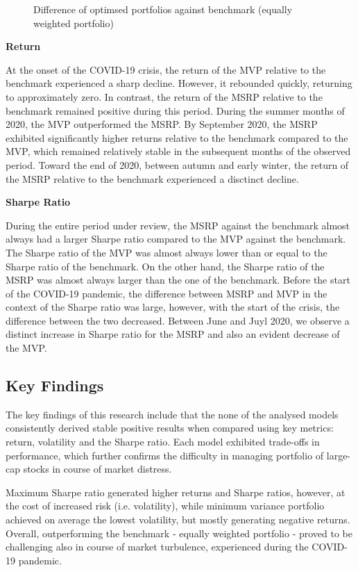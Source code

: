 \documentclass[a4paper,12pt]{article}
\begin{document}
\begin{figure}[H]
\begin{minipage}{0.7\textwidth}
    \end{minipage}
    \caption{Difference of optimsed portfolios against benchmark (equally weighted portfolio)}
    \label{fig:compare}
\end{figure}




\textbf{Return}

At the onset of the COVID-19 crisis, the return of the MVP relative to the benchmark experienced a sharp decline. However, it rebounded quickly, returning to approximately zero. In contrast, the return of the MSRP relative to the benchmark remained positive during this period. During the summer months of 2020, the MVP outperformed the MSRP. By September 2020, the MSRP exhibited significantly higher returns relative to the benchmark compared to the MVP, which remained relatively stable in the subsequent months of the observed period. Toward the end of 2020, between autumn and early winter, the return of the MSRP relative to the benchmark experienced a disctinct decline.


\textbf{Sharpe Ratio}

During the entire period under review, the MSRP against the benchmark almost always had a larger Sharpe ratio compared to the MVP against the benchmark. The Sharpe ratio of the MVP was almost always lower than or equal to the Sharpe ratio of the benchmark. On the other hand, the Sharpe ratio of the MSRP was almost always larger than the one of the benchmark. Before the start of the COVID-19 pandemic, the difference between MSRP and MVP in the context of the Sharpe ratio was large, however, with the start of the crisis, the difference between the two decreased. Between June and Juyl 2020, we observe a distinct increase in Sharpe ratio for the MSRP and also an evident decrease of the MVP. 

\subsection{Key Findings}

The key findings of this research include that the none of the analysed models consistently derived stable positive results when compared using key metrics: return, volatility and the Sharpe ratio. Each model exhibited trade-offs in performance, which further confirms the difficulty in managing portfolio of large-cap stocks in course of market distress.

Maximum Sharpe ratio generated higher returns and Sharpe ratios, however, at the cost of increased risk (i.e. volatility), while minimum variance portfolio achieved on average the lowest volatility, but mostly generating negative returns. Overall, outperforming the benchmark - equally weighted portfolio - proved to be challenging also in course of market turbulence, experienced during the COVID-19 pandemic.
\end{document}
